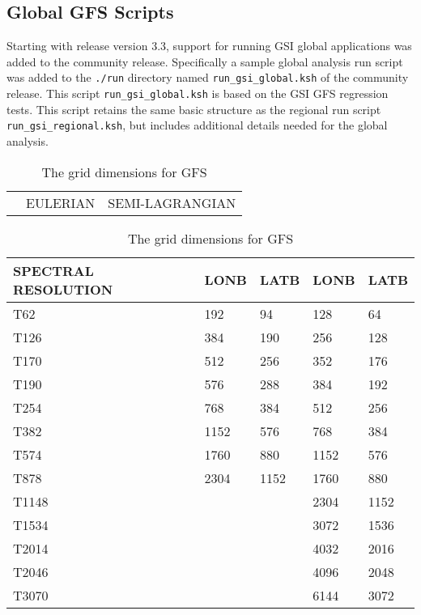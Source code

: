 \subsection{Global GFS Scripts}

Starting with release version 3.3, support for running GSI global applications was added to the community release. Specifically a sample global analysis 
run script was added to the \verb|./run| directory named \verb|run_gsi_global.ksh| of the community release. This script \verb|run_gsi_global.ksh| is 
based on the GSI GFS regression tests. This script retains the same basic structure as the regional run script \verb|run_gsi_regional.ksh|, but includes 
additional details needed for the global analysis. 

\begin{table}[htbp]
\centering
\caption{The grid dimensions for GFS}
\begin{tabular}{|p{3cm}|p{4.5cm}|p{4.45cm}|}
\hline
&EULERIAN&SEMI-LAGRANGIAN\\
\end{tabular}
\begin{tabular}{|p{3cm}|p{2cm}|p{2cm}|p{2cm}|p{2cm}|}
\hline
SPECTRAL RESOLUTION &  LONB & LATB & LONB & LATB \\
\hline
T62&192&94&128&64\\
\hline
T126&384&190&256&128\\
\hline
T170&512&256&352&176\\
\hline
T190&576&288&384&192\\
\hline
T254&768&384&512&256\\
\hline
T382&1152&576&768&384\\
\hline
T574&1760&880&1152&576\\
\hline
T878&2304&1152&1760&880\\
\hline
T1148&&&2304&1152\\
\hline
T1534&&&3072&1536\\
\hline
T2014&&&4032&2016\\
\hline
T2046&&&4096&2048\\
\hline
T3070&&&6144&3072\\
\hline
\end{tabular}
\label{ch6_table1}
\end{table} 

